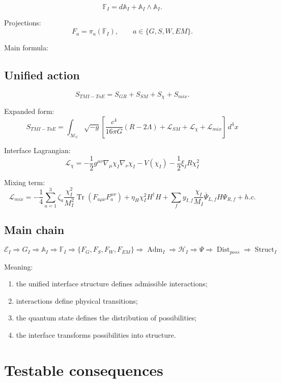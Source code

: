 \documentclass[12pt,a4paper]{article}
\DeclareMathOperator{\Tr}{Tr}
\newcommand{\Adm}{\operatorname{Adm}}
\newcommand{\Struct}{\operatorname{Struct}}
\newcommand{\Dist}{\operatorname{Dist}}
\newcommand{\dd}{\,d}
\begin{document}
\[
\boxed{\mathbb F_I=d\mathbb A_I+\mathbb A_I\wedge\mathbb A_I}.
\]

Projections:
\[
\boxed{F_a=\pi_a(\mathbb F_I),\qquad a\in\{G,S,W,EM\}}.
\]

Main formula:
\begin{center}
\end{center}

\subsection{Unified action}

\[
\boxed{S_{TMI-ToE}=S_{GR}+S_{SM}+S_\chi+S_{mix}}.
\]

Expanded form:
\[
\boxed{
S_{TMI-ToE}=\int_{\mathcal M_U}\sqrt{-g}\left[
\frac{c^4}{16\pi G}(R-2\Lambda)+\mathcal L_{SM}+\mathcal L_\chi+\mathcal L_{mix}
\right]\dd^4x
}
\]

Interface Lagrangian:
\[
\boxed{
\mathcal L_\chi=
-\frac12g^{\mu\nu}\nabla_\mu\chi_I\nabla_\nu\chi_I
-V(\chi_I)-\frac12\xi_IR\chi_I^2
}
\]

Mixing term:
\[
\boxed{
\mathcal L_{mix}=
-\frac14\sum_{a=1}^{3}\zeta_a\frac{\chi_I^2}{M_I^2}\Tr(F_{a\mu\nu}F_a^{\mu\nu})
+\eta_H\chi_I^2H^\dagger H
+\sum_f y_{I,f}\frac{\chi_I}{M_I}\bar\Psi_{L,f}H\Psi_{R,f}+h.c.
}
\]

\subsection{Main chain}

\[
\boxed{
\mathcal E_I\Rightarrow G_I\Rightarrow\mathbb A_I\Rightarrow\mathbb F_I\Rightarrow\{F_G,F_S,F_W,F_{EM}\}\Rightarrow\Adm_I\Rightarrow\mathcal H_I\Rightarrow\Psi\Rightarrow\Dist_{poss}\Rightarrow\Struct_I
}
\]

Meaning:
\begin{enumerate}
  \item the unified interface structure defines admissible interactions;
  \item interactions define physical transitions;
  \item the quantum state defines the distribution of possibilities;
  \item the interface transforms possibilities into structure.
\end{enumerate}

\section{Testable consequences}
\end{document}
